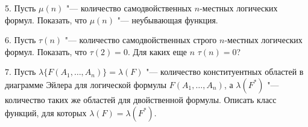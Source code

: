 5. Пусть $\mu(n)$ "--- количество самодвойственных $n$-местных логических
формул. Показать, что $\mu(n)$ "--- неубывающая функция.
%

6. Пусть $\tau(n)$ "--- количество самодвойственных строго $n$-местных
логических формул. Показать, что $\tau(2)=0$. Для каких еще $n$
$\tau(n)=0$?

7. Пусть $\lambda\{F(A_1,\dots,A_n)\}=\lambda(F)$ "--- количество
конституентных областей в диаграмме Эйлера для логической формулы
$F(A_1,\dots,A_n)$, а $\lambda(F^*)$ "--- количество таких же областей для
двойственной формулы. Описать класс функций, для которых
$\lambda(F)=\lambda(F^*)$.


